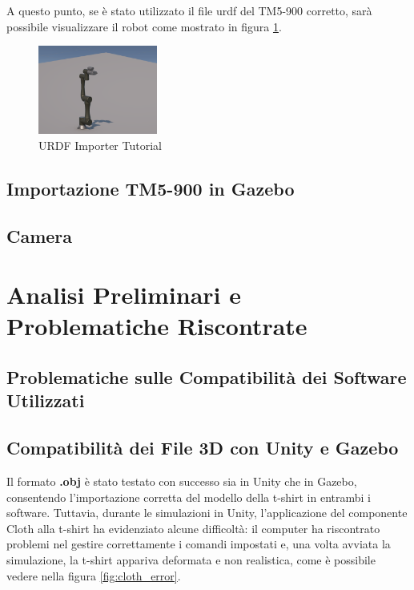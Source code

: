 \documentclass[11pt]{report}
\begin{document}
A questo punto, se è stato utilizzato il file urdf del TM5-900 corretto, sarà possibile visualizzare il robot come mostrato in figura \ref{fig:URDF_Importer_7}.
\begin{figure}[H]
    \centering
    \includegraphics[width=0.35\textwidth]{images/URDF_Importer_7.png}
    \caption{URDF Importer Tutorial}
    \label{fig:URDF_Importer_7}     
\end{figure}

\section{Importazione TM5-900 in Gazebo}

\section{Camera}

\chapter{Analisi Preliminari e Problematiche Riscontrate}

\section{Problematiche sulle Compatibilità dei Software Utilizzati}

\section{Compatibilità dei File 3D con Unity e Gazebo}
Il formato \textbf{.obj} è stato testato con successo sia in Unity che in Gazebo, consentendo l'importazione corretta del modello della t-shirt in entrambi i software. Tuttavia, durante le simulazioni in Unity, l'applicazione del componente Cloth alla t-shirt ha evidenziato alcune difficoltà: il computer ha riscontrato problemi nel gestire correttamente i comandi impostati e, una volta avviata la simulazione, la t-shirt appariva deformata e non realistica, come è possibile vedere nella figura \ref{fig:cloth_error}.
\end{document}
